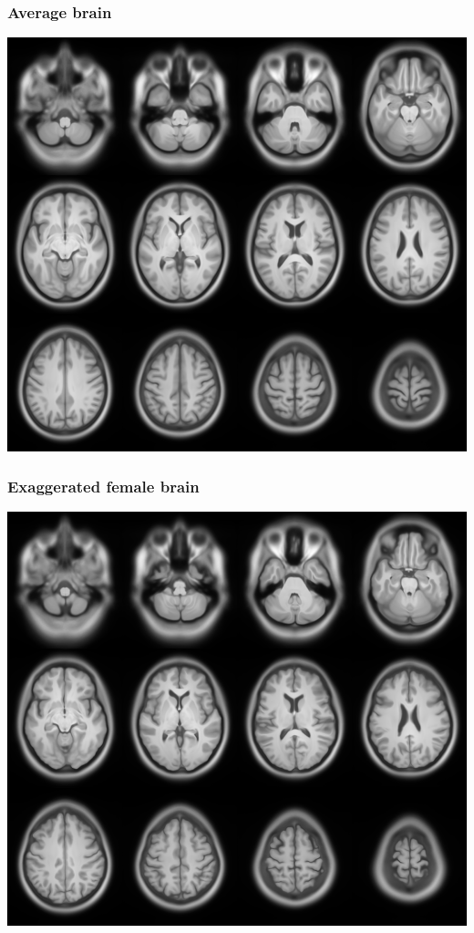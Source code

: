 \begin{frame}
\frametitle{Average brain}
\begin{center}
\includegraphics[width=.7\textwidth]{avgT1}
\end{center}
\end{frame}



\begin{frame}
\frametitle{Exaggerated female brain}
\begin{center}
\includegraphics[width=.7\textwidth]{hyper_female}
\end{center}
\end{frame}

